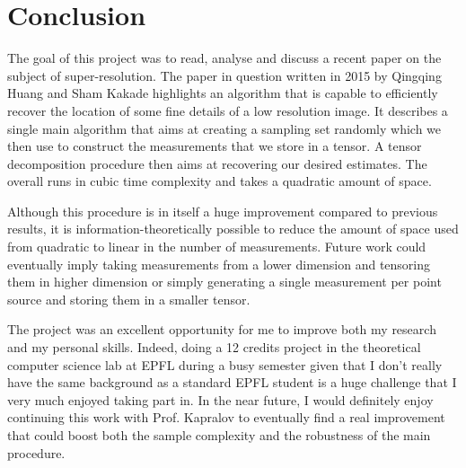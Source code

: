 \chapter{Conclusion}
The goal of this project was to read, analyse and discuss a recent paper on the subject of super-resolution. The paper in question written in 2015 by Qingqing Huang and Sham Kakade highlights an algorithm that is capable to efficiently recover the location of some fine details of a low resolution image. It describes a single main algorithm that aims at creating a sampling set randomly which we then use to construct the measurements that we store in a tensor. A tensor decomposition procedure then aims at recovering our desired estimates. The overall runs in cubic time complexity and takes a quadratic amount of space.\par

Although this procedure is in itself a huge improvement compared to previous results, it is information-theoretically possible to reduce the amount of space used from quadratic to linear in the number of measurements. Future work could eventually imply taking measurements from a lower dimension and tensoring them in higher dimension or simply generating a single measurement per point source and storing them in a smaller tensor.\par

The project was an excellent opportunity for me to improve both my research and my personal skills. Indeed, doing a 12 credits project in the theoretical computer science lab at EPFL during a busy semester given that I don't really have the same background as a standard EPFL student is a huge challenge that I very much enjoyed taking part in. In the near future, I would definitely enjoy continuing this work with Prof. Kapralov to eventually find a real improvement that could boost both the sample complexity and the robustness of the main procedure.